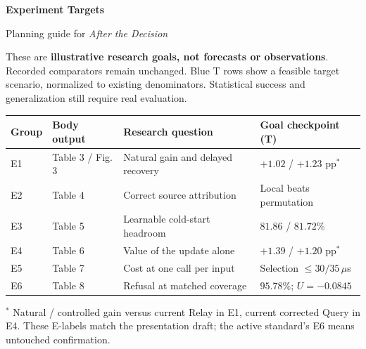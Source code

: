 \documentclass[10pt,letterpaper]{article}
\newcommand{\note}[1]{{\fontsize{8.5}{10.5}\selectfont #1\par}}
\newenvironment{clean}{\begin{center}\fontsize{9.5}{11.5}\selectfont\setlength{\tabcolsep}{8pt}\renewcommand{\arraystretch}{1.10}}{\end{center}}
\begin{document}
{\LARGE\bfseries Experiment Targets}\par
{\large Planning guide for \emph{After the Decision}}\par
These are \textbf{illustrative research goals, not forecasts or observations}. Recorded comparators remain unchanged. Blue T rows show a feasible target scenario, normalized to existing denominators. Statistical success and generalization still require real evaluation.

\begin{clean}
\begin{tabular}{@{}llp{2.13in}p{1.53in}@{}}
\toprule
Group & Body output & Research question & Goal checkpoint (T) \\
\midrule
E1 & Table 3 / Fig. 3 & Natural gain and delayed recovery & $+1.02$ / $+1.23$ pp$^*$ \\
E2 & Table 4 & Correct source attribution & Local beats permutation \\
E3 & Table 5 & Learnable cold-start headroom & $81.86$ / $81.72\%$ \\
E4 & Table 6 & Value of the update alone & $+1.39$ / $+1.20$ pp$^*$ \\
E5 & Table 7 & Cost at one call per input & Selection $\leq30/35\,\mu$s \\
E6 & Table 8 & Refusal at matched coverage & $95.78\%$; $U=-0.0845$ \\
\bottomrule
\end{tabular}
\end{clean}
\note{$^*$ Natural / controlled gain versus current Relay in E1, current corrected Query in E4. These E-labels match the presentation draft; the active standard's E6 means untouched confirmation.}
\end{document}
